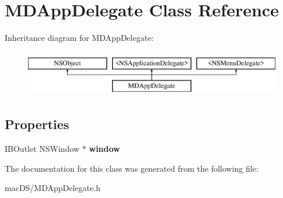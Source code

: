 \hypertarget{interface_m_d_app_delegate}{\section{M\-D\-App\-Delegate Class Reference}
\label{interface_m_d_app_delegate}
}
Inheritance diagram for M\-D\-App\-Delegate\-:\begin{figure}[H]
\begin{center}
\leavevmode
\includegraphics[height=2.000000cm]{interface_m_d_app_delegate}
\end{center}
\end{figure}
\subsection*{Properties}
\begin{DoxyCompactItemize}
\item 
\hypertarget{interface_m_d_app_delegate_a0758151aaf56aadb705303b2715081c8}{I\-B\-Outlet N\-S\-Window $\ast$ {\bfseries window}}\label{interface_m_d_app_delegate_a0758151aaf56aadb705303b2715081c8}

\end{DoxyCompactItemize}


The documentation for this class was generated from the following file\-:\begin{DoxyCompactItemize}
\item 
mac\-D\-S/M\-D\-App\-Delegate.\-h\end{DoxyCompactItemize}
